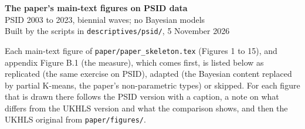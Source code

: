 \documentclass[11pt,a4paper]{article}
\begin{document}
\begin{center}
{\Large\bfseries The paper's main-text figures on PSID data}\\[4pt]
PSID 2003 to 2023, biennial waves; no Bayesian models\\[2pt]
\small Built by the scripts in \texttt{descriptives/psid/}, 5 November 2026
\end{center}

Each main-text figure of \texttt{paper/paper\_skeleton.tex} (Figures 1 to 15), and appendix Figure B.1 (the measure), which comes first, is listed below as replicated (the same exercise on PSID), adapted (the Bayesian content replaced by partial K-means, the paper's non-parametric types) or skipped. For each figure that is drawn there follows the PSID version with a caption, a note on what differs from the UKHLS version and what the comparison shows, and then the UKHLS original from \texttt{paper/figures/}.
\end{document}
